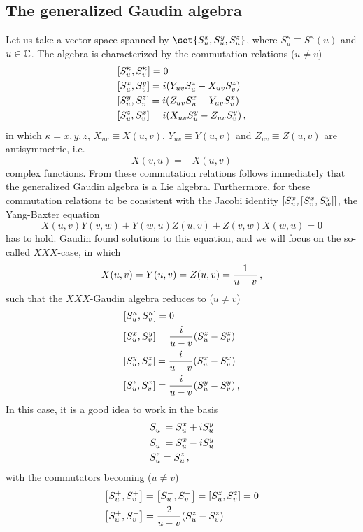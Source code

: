     \subsection{The generalized Gaudin algebra}
        Let us take a vector space spanned by $\set{S^x_u, S^y_u, S^z_u}$, where $S^\kappa_u \equiv S^\kappa(u)$ and $u \in \mathbb{C}$. The algebra is characterized by the commutation relations ($u \neq v$)
        \begin{align}
            & \comm{S^\kappa_u}{S^\kappa_v} = 0 \\
            & \comm{S^x_u}{S^y_v} = i \qty( Y_{uv} S^z_u - X_{uv} S^z_v ) \\
            & \comm{S^y_u}{S^z_v} = i \qty( Z_{uv} S^x_u - Y_{uv} S^x_v ) \\
            & \comm{S^z_u}{S^x_v} = i \qty( X_{uv} S^y_u - Z_{uv} S^y_v ) \thinspace ,
        \end{align}
        in which $\kappa=x,y,z$, $X_{uv} \equiv X(u,v)$, $Y_{uv} \equiv Y(u,v)$ and $Z_{uv} \equiv Z(u,v)$ are antisymmetric, i.e.
        \begin{equation}
            X(v, u) = - X(u, v)
        \end{equation}
        complex functions. From these commutation relations follows immediately that the generalized Gaudin algebra is a Lie algebra. Furthermore, for these commutation relations to be consistent with the Jacobi identity $\comm{S^x_u}{\comm{S^x_v}{S^y_w}}$, the Yang-Baxter equation
        \begin{equation}
            X(u, v) Y(v, w) + Y(w, u) Z(u, v) + Z(v, w) X(w, u) = 0
        \end{equation}
        has to hold. Gaudin \cite{gaudin1976} found solutions to this equation, and we will focus on the so-called $XXX$-case, in which
        \begin{equation}
            X(u, v) = Y(u, v) = Z(u, v) = \frac{1}{u - v} \thinspace ,
        \end{equation}
        such that the $XXX$-Gaudin algebra reduces to ($u \neq v$)
        \begin{align}
            & \comm{S^\kappa_u}{S^\kappa_v} = 0 \\
            & \comm{S^x_u}{S^y_v} = \frac{i}{u-v} \qty(S^z_u - S^z_v) \\
            & \comm{S^y_u}{S^z_v} = \frac{i}{u-v} \qty(S^x_u - S^x_v) \\
            & \comm{S^z_u}{S^x_v} = \frac{i}{u-v} \qty(S^y_u - S^y_v) \thinspace ,
        \end{align}
        In this case, it is a good idea to work in the basis
        \begin{align}
            & S^+_u = S^x_u + i S^y_u \\
            & S^-_u = S^x_u - i S^y_u \\
            & S^z_u = S^z_u \thinspace ,
        \end{align}
        with the commutators becoming ($u \neq v$)
        \begin{align}
            & \comm{S^+_u}{S^+_v} = \comm{S^-_u}{S^-_v} = \comm{S^z_u}{S^z_v} = 0 \\
            & \comm{S^+_u}{S^-_v} = \frac{2}{u-v} \qty(S^z_u - S^z_v)
        \end{align}

